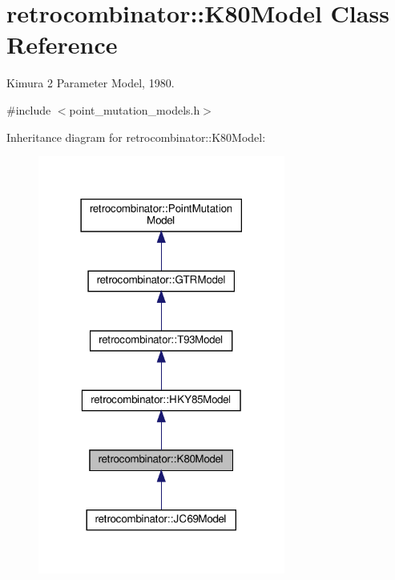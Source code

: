 \hypertarget{classretrocombinator_1_1K80Model}{}\section{retrocombinator\+:\+:K80\+Model Class Reference}
\label{classretrocombinator_1_1K80Model}


Kimura 2 Parameter Model, 1980.  




{\ttfamily \#include $<$point\+\_\+mutation\+\_\+models.\+h$>$}



Inheritance diagram for retrocombinator\+:\+:K80\+Model\+:
\nopagebreak
\begin{figure}[H]
\begin{center}
\leavevmode
\includegraphics[width=230pt]{classretrocombinator_1_1K80Model__inherit__graph}
\end{center}
\end{figure}


